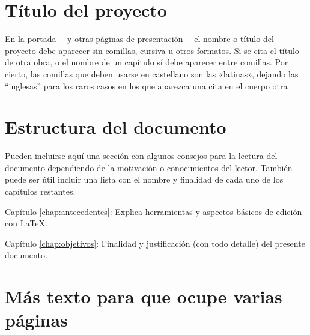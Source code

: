 \section{Título del proyecto}

En la portada ---y otras páginas de presentación--- el nombre o título del
proyecto debe aparecer sin comillas, cursiva u otros formatos. Si se cita el
título de otra obra, o el nombre de un capítulo sí debe aparecer entre
comillas. Por cierto, las comillas que deben usarse en castellano son las
«latinas», dejando las ``inglesas'' para los raros casos en los que aparezca una
cita en el cuerpo otra~\cite{sousa}.


\section{Estructura del documento}

Pueden incluirse aquí una sección con algunos consejos para la lectura del
documento dependiendo de la motivación o conocimientos del lector.  También
puede ser útil incluir una lista con el nombre y finalidad de cada uno de los
capítulos restantes.

\begin{definitionlist}
\item[Capítulo \ref{chap:antecedentes}: \nameref{chap:antecedentes}] Explica herramientas
  y aspectos básicos de edición con \LaTeX.
\item[Capítulo \ref{chap:objetivos}: \nameref{chap:objetivos}] Finalidad y justificación
  (con todo detalle) del presente documento.
\end{definitionlist}


\section{Más texto para que ocupe varias páginas}

\blindtext
\blinditemize[4]
\blindmathpaper



